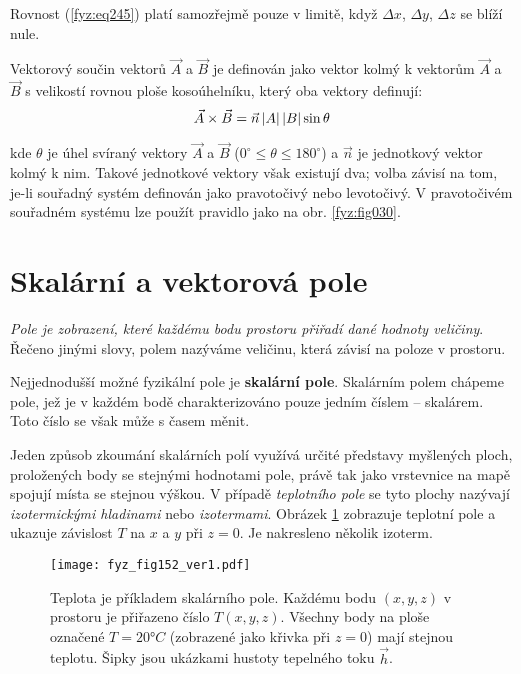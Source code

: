 {    Rovnost (\ref{fyz:eq245}) platí samozřejmě pouze v limitě, když \(\Delta x\), \(\Delta 
    y\), \(\Delta z\) se blíží nule.
   
    Vektorový součin vektorů $\vec{A}$ a $\vec{B}$ je definován jako vektor kolmý k vektorům 
    $\vec{A}$ a $\vec{B}$ s velikostí rovnou ploše kosoúhelníku, který oba vektory definují:
    \begin{equation}\label{fyz:eq247}
      \vec{A}\times\vec{B} = \vec{n}\left\lvert A\right\rvert\left\lvert B\right\rvert\sin\theta
    \end{equation} 

    kde $\theta$ je úhel svíraný vektory $\vec{A}$ a $\vec{B}$ ($0^\circ\leq\theta\leq180^\circ$) a 
    $\vec{n}$ je jednotkový vektor kolmý k nim. Takové jednotkové vektory však existují dva; volba 
    závisí na tom, je-li souřadný systém definován jako pravotočivý nebo levotočivý. V pravotočivém 
    souřadném systému lze použít pravidlo jako na obr. \ref{fyz:fig030}.
      
    \section{Skalární a vektorová pole}
      \emph{Pole je zobrazení, které každému bodu prostoru přiřadí dané hodnoty veličiny}. Řečeno 
      jinými slovy, polem nazýváme veličinu, která závisí na poloze v prostoru.
      
      Nejjednodušší možné fyzikální pole je \textbf{ska\-lá\-rní pole}. Skalárním polem chápeme 
      pole, jež je v každém bodě charakterizováno pouze jedním číslem – skalárem. Toto číslo se 
      však může s časem měnit.
      
      Jeden způsob zkoumání skalár\-ních polí využívá určité představy myšle\-ných ploch, 
      pro\-ložených body se stejnými hodnotami pole, právě tak jako vrstevnice na mapě spojují 
      místa se stejnou výškou. V případě \emph{teplotního pole} se tyto plochy nazývají 
      \emph{izotermickými hladinami} nebo \emph{izotermami}. Obrázek \ref{fyz:fig152} zobrazuje 
      teplotní pole a ukazuje závislost \(T\) na \(x\) a \(y\) při \(z = 0\). Je nakresleno několik 
      izoterm.

      \begin{figure}[ht!]
       \centering
       \texttt{[image: fyz\_fig152\_ver1.pdf]}
       \caption{Teplota je příkladem skalárního pole. Každému bodu $(x,y,z)$ v prostoru je 
                přiřazeno číslo $T(x,y,z)$. Všechny body na ploše označené $T = 20°C$ (zobrazené 
                jako křivka při $z=0$) mají stejnou teplotu. Šipky jsou ukázkami hustoty tepelného 
                toku $\vec{h}$.
                \cite[s.~29]{Feynman02}}
       \label{fyz:fig152} 
      \end{figure}
            
}

